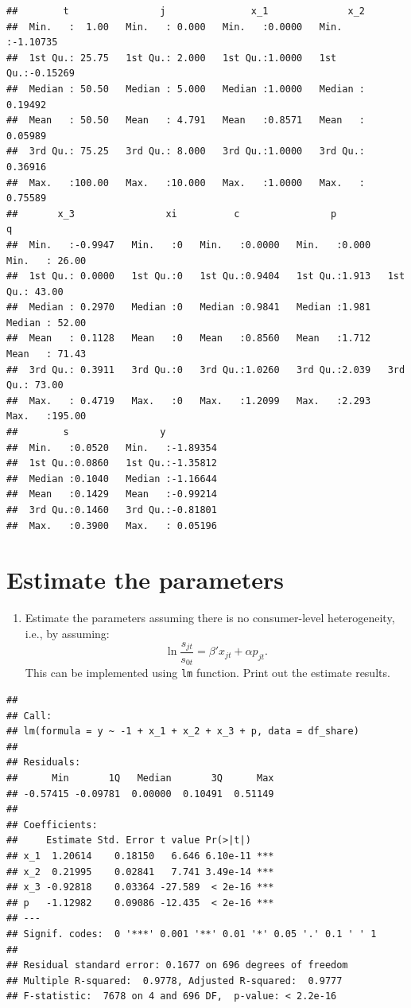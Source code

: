 \documentclass[
]{book}
\providecommand{\tightlist}{%
  \setlength{\itemsep}{0pt}\setlength{\parskip}{0pt}}
\begin{document}
\begin{verbatim}
##        t                j               x_1              x_2          
##  Min.   :  1.00   Min.   : 0.000   Min.   :0.0000   Min.   :-1.10735  
##  1st Qu.: 25.75   1st Qu.: 2.000   1st Qu.:1.0000   1st Qu.:-0.15269  
##  Median : 50.50   Median : 5.000   Median :1.0000   Median : 0.19492  
##  Mean   : 50.50   Mean   : 4.791   Mean   :0.8571   Mean   : 0.05989  
##  3rd Qu.: 75.25   3rd Qu.: 8.000   3rd Qu.:1.0000   3rd Qu.: 0.36916  
##  Max.   :100.00   Max.   :10.000   Max.   :1.0000   Max.   : 0.75589  
##       x_3                xi          c                p               q         
##  Min.   :-0.9947   Min.   :0   Min.   :0.0000   Min.   :0.000   Min.   : 26.00  
##  1st Qu.: 0.0000   1st Qu.:0   1st Qu.:0.9404   1st Qu.:1.913   1st Qu.: 43.00  
##  Median : 0.2970   Median :0   Median :0.9841   Median :1.981   Median : 52.00  
##  Mean   : 0.1128   Mean   :0   Mean   :0.8560   Mean   :1.712   Mean   : 71.43  
##  3rd Qu.: 0.3911   3rd Qu.:0   3rd Qu.:1.0260   3rd Qu.:2.039   3rd Qu.: 73.00  
##  Max.   : 0.4719   Max.   :0   Max.   :1.2099   Max.   :2.293   Max.   :195.00  
##        s                y           
##  Min.   :0.0520   Min.   :-1.89354  
##  1st Qu.:0.0860   1st Qu.:-1.35812  
##  Median :0.1040   Median :-1.16644  
##  Mean   :0.1429   Mean   :-0.99214  
##  3rd Qu.:0.1460   3rd Qu.:-0.81801  
##  Max.   :0.3900   Max.   : 0.05196
\end{verbatim}

\hypertarget{estimate-the-parameters-1}{%
\section{Estimate the parameters}\label{estimate-the-parameters-1}}

\begin{enumerate}
\def\labelenumi{\arabic{enumi}.}
\tightlist
\item
  Estimate the parameters assuming there is no consumer-level heterogeneity, i.e., by assuming:
  \[
  \ln \frac{s_{jt}}{s_{0t}} = \beta' x_{jt} + \alpha p_{jt}.
  \]
  This can be implemented using \texttt{lm} function. Print out the estimate results.
\end{enumerate}

\begin{verbatim}
## 
## Call:
## lm(formula = y ~ -1 + x_1 + x_2 + x_3 + p, data = df_share)
## 
## Residuals:
##      Min       1Q   Median       3Q      Max 
## -0.57415 -0.09781  0.00000  0.10491  0.51149 
## 
## Coefficients:
##     Estimate Std. Error t value Pr(>|t|)    
## x_1  1.20614    0.18150   6.646 6.10e-11 ***
## x_2  0.21995    0.02841   7.741 3.49e-14 ***
## x_3 -0.92818    0.03364 -27.589  < 2e-16 ***
## p   -1.12982    0.09086 -12.435  < 2e-16 ***
## ---
## Signif. codes:  0 '***' 0.001 '**' 0.01 '*' 0.05 '.' 0.1 ' ' 1
## 
## Residual standard error: 0.1677 on 696 degrees of freedom
## Multiple R-squared:  0.9778, Adjusted R-squared:  0.9777 
## F-statistic:  7678 on 4 and 696 DF,  p-value: < 2.2e-16
\end{verbatim}
\end{document}
